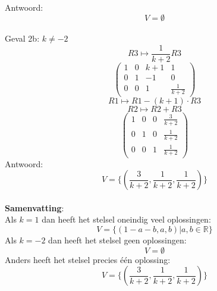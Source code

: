 \documentclass[10pt,a4paper]{article}
\begin{document}
Antwoord:
\[
V=\emptyset
\]\\
Geval 2b: $k\neq-2$\\
\[ R3 \longmapsto \frac{1}{k+2}R3\]
\[
\begin{pmatrix}
1 &  0 &  k+1 & 1\\
0 &  1 & -1 & 0\\
0 &  0 &  1 & \frac{1}{k+2}
\end{pmatrix}
\]
\[ R1 \longmapsto R1 - (k+1)\cdot R3\]
\[ R2 \longmapsto R2 + R3\]
\[
\begin{pmatrix}
1 &  0 &  0 & \frac{3}{k+2}\\
0 &  1 &  0 & \frac{1}{k+2}\\
0 &  0 &  1 & \frac{1}{k+2}
\end{pmatrix}
\]
Antwoord:
\[
V=\{(\frac{3}{k+2},\frac{1}{k+2},\frac{1}{k+2})\}
\]\\
\textbf{Samenvatting}:\\
Als $k=1$ dan heeft het stelsel oneindig veel oplossingen:
\[
V=\{ (1-a-b,a,b) | a,b \in \mathbb{R}\}
\]
Als $k=-2$ dan heeft het stelsel geen oplossingen:
\[
V=\emptyset
\]
Anders heeft het stelsel precies één oplossing:
\[
V=\{(\frac{3}{k+2},\frac{1}{k+2},\frac{1}{k+2})\}
\]
\end{document}
